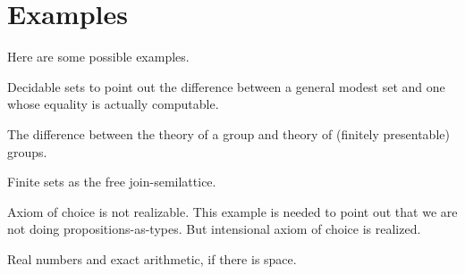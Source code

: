 \section{Examples}
\label{sec:examples}

Here are some possible examples.

Decidable sets to point out the difference between a general modest
set and one whose equality is actually computable.

The difference between the theory of a group and theory of (finitely
presentable) groups.

Finite sets as the free join-semilattice.

Axiom of choice is not realizable. This example is needed to point out
that we are not doing propositions-as-types. But intensional axiom of
choice is realized.

Real numbers and exact arithmetic, if there is space.


